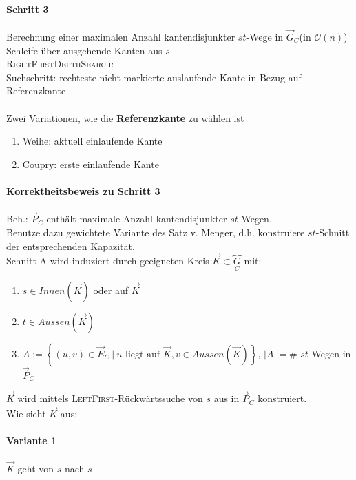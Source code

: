 \documentclass{article}
\newcommand{\df}[1]{\textbf{#1}\index{#1}}
\renewcommand{\O}[1]{\mathcal{O}\left(#1\right)}
\newcommand{\set}[2]{\left\lbrace #1~|~#2 \right\rbrace}
\begin{document}
\paragraph{Schritt 3}
Berechnung einer maximalen Anzahl kantendisjunkter $st$-Wege in $\overrightarrow{G}_C$(in $\O{n}$)\\
Schleife über ausgehende Kanten aus $s$\\
\textsc{RightFirstDepthSearch}:\\
Suchschritt: rechteste nicht markierte auslaufende Kante in Bezug auf Referenzkante\\\\

Zwei Variationen, wie die \df{Referenzkante} zu wählen ist
\begin{enumerate}
	\item Weihe: aktuell einlaufende Kante
	\item Coupry: erste einlaufende Kante
\end{enumerate}

\paragraph{Korrektheitsbeweis zu Schritt 3}
Beh.: $\overrightarrow{P}_C$ enthält maximale Anzahl kantendisjunkter $st$-Wegen.\\
Benutze dazu gewichtete Variante des Satz v. Menger, d.h. konstruiere $st$-Schnitt der entsprechenden Kapazität.\\
Schnitt A wird induziert durch geeigneten Kreis $\overrightarrow{K} \subset \overbrace{G}_C$ mit:
\begin{enumerate}
	\item $s\in Innen(\overrightarrow{K})$ oder auf $\overrightarrow{K}$
	\item $t \in Aussen(\overrightarrow{K})$
	\item $A :=\set{(u,v)\in \overrightarrow{E}_C}{u \text{ liegt auf }\overrightarrow{K}, v \in Aussen(\overrightarrow{K})}$, $|A| = $\# $st$-Wegen in $\overrightarrow{P}_C$
\end{enumerate}

$\overrightarrow{K}$ wird mittels \textsc{LeftFirst}-Rückwärtssuche von $s$ aus in $\overrightarrow{P}_C$ konstruiert.\\
Wie sieht $\overrightarrow{K}$ aus:
\paragraph{Variante 1}
$\overrightarrow{K}$ geht von $s$ nach $s$
\end{document}
